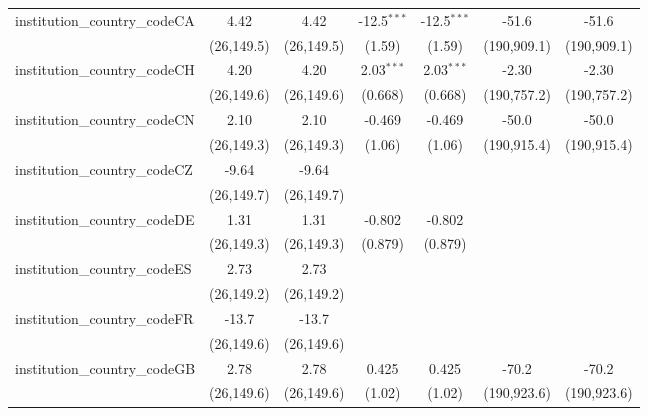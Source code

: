 \begin{tabular}{lcccccc}
   institution\_country\_codeCA          & 4.42         & 4.42         & -12.5$^{***}$ & -12.5$^{***}$ & -51.6       & -51.6\\   
                                         & (26,149.5)   & (26,149.5)   & (1.59)        & (1.59)        & (190,909.1) & (190,909.1)\\   
   institution\_country\_codeCH          & 4.20         & 4.20         & 2.03$^{***}$  & 2.03$^{***}$  & -2.30       & -2.30\\   
                                         & (26,149.6)   & (26,149.6)   & (0.668)       & (0.668)       & (190,757.2) & (190,757.2)\\   
   institution\_country\_codeCN          & 2.10         & 2.10         & -0.469        & -0.469        & -50.0       & -50.0\\   
                                         & (26,149.3)   & (26,149.3)   & (1.06)        & (1.06)        & (190,915.4) & (190,915.4)\\   
   institution\_country\_codeCZ          & -9.64        & -9.64        &               &               &             &   \\   
                                         & (26,149.7)   & (26,149.7)   &               &               &             &   \\   
   institution\_country\_codeDE          & 1.31         & 1.31         & -0.802        & -0.802        &             &   \\   
                                         & (26,149.3)   & (26,149.3)   & (0.879)       & (0.879)       &             &   \\   
   institution\_country\_codeES          & 2.73         & 2.73         &               &               &             &   \\   
                                         & (26,149.2)   & (26,149.2)   &               &               &             &   \\   
   institution\_country\_codeFR          & -13.7        & -13.7        &               &               &             &   \\   
                                         & (26,149.6)   & (26,149.6)   &               &               &             &   \\   
   institution\_country\_codeGB          & 2.78         & 2.78         & 0.425         & 0.425         & -70.2       & -70.2\\   
                                         & (26,149.6)   & (26,149.6)   & (1.02)        & (1.02)        & (190,923.6) & (190,923.6)\\   

\end{tabular}
